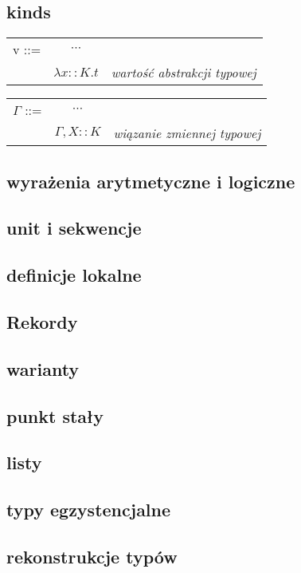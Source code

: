 \documentclass[11pt,leqno]{article}
\begin{document}
\subsection{kinds}



\begin{tabular}{ l c r }
  v ::= & $\cdots$ &  \\
   & $\lambda x::K.t$ & \textit{wartość abstrakcji typowej} \\
\end{tabular}

\begin{tabular}{ l c r }
  $\Gamma$ ::= & $\cdots$ &  \\
   & $\Gamma,X::K$& \textit{wiązanie zmiennej typowej} \\ 
\end{tabular}

\subsection{wyrażenia arytmetyczne i logiczne}

\subsection{unit i sekwencje}
\subsection{definicje lokalne}
\subsection{Rekordy}
\subsection{warianty}
\subsection{punkt stały}
\subsection{listy}
\subsection{typy egzystencjalne}
\subsection{rekonstrukcje typów}
\end{document}

